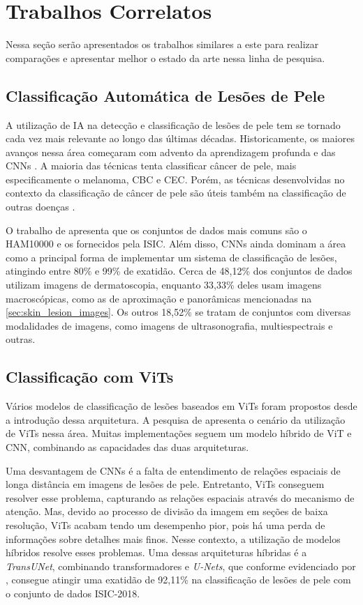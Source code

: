 \chapter{Trabalhos Correlatos} %

Nessa seção serão apresentados os trabalhos similares a este para realizar comparações e apresentar melhor o estado da arte nessa linha de pesquisa.

\section{Classificação Automática de Lesões de Pele}

A utilização de \ac{IA} na detecção e classificação de lesões de pele tem se tornado cada vez mais relevante ao longo das últimas décadas. Historicamente, os maiores
avanços nessa área começaram com advento da aprendizagem profunda e das \acp{CNN} \cite{li2019artificial}. A maioria das técnicas tenta classificar câncer de pele, mais
especificamente o melanoma, \ac{CBC} e \ac{CEC}. Porém, as técnicas desenvolvidas no contexto da classificação de câncer de pele são úteis também na classificação de
outras doenças \cite{okuboyejo2018review}.

O trabalho de \textcite{skin_cancer_ai} apresenta que os conjuntos de dados mais comuns são o HAM10000 e os fornecidos pela \ac{ISIC}. Além disso, \acp{CNN} ainda dominam
a área como a principal forma de implementar um sistema de classificação de lesões, atingindo entre 80\% e 99\% de exatidão. Cerca de 48,12\% dos conjuntos de
dados utilizam imagens de dermatoscopia, enquanto 33,33\% deles usam imagens macroscópicas, como as de aproximação e panorâmicas mencionadas na
\autoref{sec:skin_lesion_images}. Os outros 18,52\% se tratam de conjuntos com diversas modalidades de imagens, como imagens de ultrasonografia, multiespectrais e outras.

\section{Classificação com ViTs}

Vários modelos de classificação de lesões baseados em \acp{ViT} foram propostos desde a introdução dessa arquitetura. A pesquisa de \textcite{khan2023identifying}
apresenta o cenário da utilização de \acp{ViT} nessa área. Muitas implementações seguem um modelo híbrido de \ac{ViT} e \ac{CNN}, combinando as capacidades das duas
arquiteturas.

Uma desvantagem de \acp{CNN} é a falta de entendimento de relações espaciais de longa distância em imagens de lesões de pele. Entretanto, \acp{ViT} conseguem resolver
esse problema, capturando as relações espaciais através do mecanismo de atenção. Mas, devido ao processo de divisão da imagem em seções de baixa resolução, \acp{ViT}
acabam tendo um desempenho pior, pois há uma perda de informações sobre detalhes mais finos. Nesse contexto, a utilização de modelos híbridos resolve esses problemas.
Uma dessas arquiteturas híbridas é a \textit{TransUNet}, combinando transformadores e \textit{U-Nets}, que conforme evidenciado por \textcite{gulzar2022skin}, consegue
atingir uma exatidão de 92,11\% na classificação de lesões de pele com o conjunto de dados \ac{ISIC}-2018.

